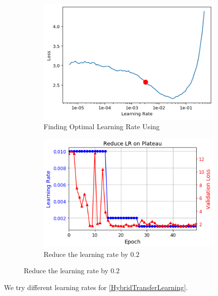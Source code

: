 \documentclass{article}
\begin{document}
\begin{figure}
    \centering
    
    \begin{subfigure}[b]{0.5\linewidth}
    \includegraphics[width=\linewidth]{data/images/05_Comparision/Learning_rate_finder.png}
    \caption{Finding Optimal Learning Rate Using \cite{1CyclePolicy} }
    \label{fig:1CyclePolicy}
    \end{subfigure}
    \begin{subfigure}[b]{0.5\linewidth}
    \includegraphics[width=\linewidth]{data/images/05_Results/Lower_Lr_Plateau.png}
    \caption{Reduce the learning rate by $0.2$}
    \label{fig:reduce_lr}
    \end{subfigure}
    
\end{figure}


We try different learning rates for \ref{HybridTransferLearning}. 
\end{document}
